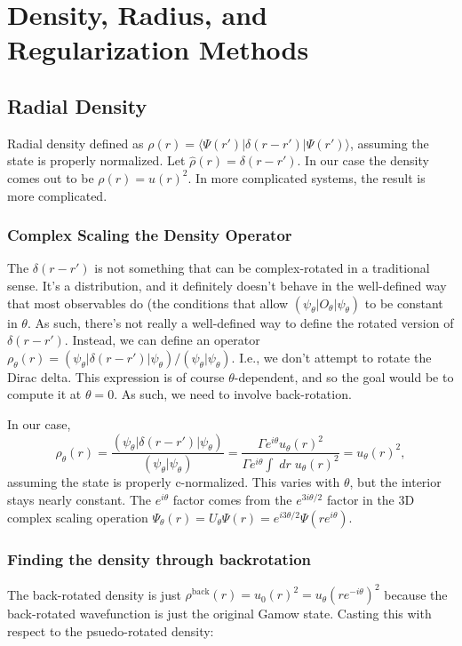 \section{Density, Radius, and Regularization Methods}
\subsection{Radial Density}
Radial density defined as $\rho(r) = \langle \Psi(r')| \delta(r - r') | \Psi(r')\rangle$, assuming the state is properly normalized. Let $\hat{\rho}(r) = \delta(r-r')$. In our case the density comes out to be $\rho(r)= u(r)^2$. In more complicated systems, the result is more complicated.

\subsubsection{Complex Scaling the Density Operator}
The $\delta(r - r')$ is not something that can be complex-rotated in a traditional sense. It's a distribution, and it definitely doesn't behave in the well-defined way that most observables do (the conditions that allow $(\psi_\theta | O_\theta | \psi_\theta)$ to be constant in $\theta$. As such, there's not really a well-defined way to define the rotated version of $\delta(r - r')$. Instead, we can define an operator $\rho_\theta(r) = (\psi_\theta|\delta(r-r')|\psi_\theta)/(\psi_\theta|\psi_\theta)$. I.e., we don't attempt to rotate the Dirac delta. This expression is of course $\theta$-dependent, and so the goal would be to compute it at $\theta=0$. As such, we need to involve back-rotation. 

In our case, 
$$
\rho_\theta(r) = \frac{(\psi_\theta|\delta(r-r')|\psi_\theta)}{(\psi_\theta|\psi_\theta)} = \frac{\Gamma e^{i\theta}u_\theta(r)^2}{ \Gamma e^{i\theta}\int\;dr\; u_\theta(r)^2} = u_\theta(r)^2,
$$
assuming the state is properly c-normalized. This varies with $\theta$, but the interior stays nearly constant. The $e^{i\theta}$ factor comes from the $e^{3i\theta/2}$ factor in the 3D complex scaling operation $\Psi_\theta(r) = U_\theta\Psi(r) = e^{i3\theta/2}\Psi(re^{i\theta})$.
\subsubsection{Finding the density through backrotation}
The back-rotated density is just $\rho^{\text{back}}(r) = u_0(r)^2 =  u_\theta(re^{-i\theta})^2$ because the back-rotated wavefunction is just the original Gamow state. Casting this with respect to the psuedo-rotated density:

